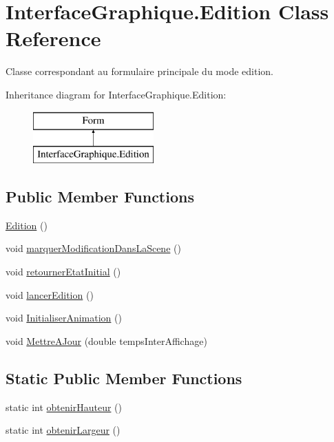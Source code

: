 \hypertarget{class_interface_graphique_1_1_edition}{}\section{Interface\+Graphique.\+Edition Class Reference}
\label{class_interface_graphique_1_1_edition}


Classe correspondant au formulaire principale du mode edition.  


Inheritance diagram for Interface\+Graphique.\+Edition\+:\begin{figure}[H]
\begin{center}
\leavevmode
\includegraphics[height=2.000000cm]{class_interface_graphique_1_1_edition}
\end{center}
\end{figure}
\subsection*{Public Member Functions}
\begin{DoxyCompactItemize}
\item 
\hyperlink{group__inf2990_gaf27d4a0baf5a55d5383c734caaca0627}{Edition} ()
\item 
void \hyperlink{group__inf2990_ga127e6281d56016e29c2d728a5269895f}{marquer\+Modification\+Dans\+La\+Scene} ()
\item 
void \hyperlink{group__inf2990_gacaa441d461a6dafd8c2c8931b00cf689}{retourner\+Etat\+Initial} ()
\item 
void \hyperlink{group__inf2990_ga5be11fa503e06bd8a549594dab9858b3}{lancer\+Edition} ()
\item 
void \hyperlink{group__inf2990_ga36fccefad6bf9be3fb751979799de906}{Initialiser\+Animation} ()
\item 
void \hyperlink{group__inf2990_ga9c082e311bc8dd83bdef34a670fecfe0}{Mettre\+A\+Jour} (double temps\+Inter\+Affichage)
\end{DoxyCompactItemize}
\subsection*{Static Public Member Functions}
\begin{DoxyCompactItemize}
\item 
static int \hyperlink{group__inf2990_ga0c985271a0f6bdf6375d3aac95f67f70}{obtenir\+Hauteur} ()
\item 
static int \hyperlink{group__inf2990_ga4cf2fe15ce71cea18daf36cf365402c8}{obtenir\+Largeur} ()
\end{DoxyCompactItemize}
